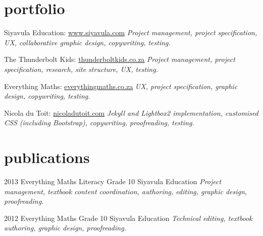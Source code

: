 \documentclass[]{friggeri-cv} %
\begin{document}
\pagebreak

\section{portfolio}
\begin{sitelist}

\site
{}
{Siyavula Education: \href{http://www.siyavula.com}{\underline{www.siyavula.com}}}
{}
{\emph{Project management, project specification, UX, collaborative graphic design, copywriting, testing.}}


\site
{}
{The Thunderbolt Kids: \href{http://thunderboltkids.co.za}{\underline{thunderboltkids.co.za}}}
{}
{\emph{Project management, project specification, research, site structure, UX, testing.}}

\site
{}
{Everything Maths: \href{http://www.everythingmaths.co.za}{\underline{everythingmaths.co.za}}}
{}
{\emph{UX, project specification, graphic design, copywriting, testing.}}



\site
{}
{Nicola du Toit: \href{http://www.nicoladutoit.com/ux-portfolio}{\underline{nicoladutoit.com}}}
{}
{\emph{Jekyll and Lightbox2 implementation, customised CSS (including Bootstrap), copywriting, proofreading, testing.}}
\end{sitelist}

\section{publications}
\begin{entrylist}
\entry
{2013}
{Everything Maths Literacy Grade 10}
{Siyavula Education}
{\emph{Project management, textbook content coordination, authoring, editing, graphic design, proofreading.}}

\entry
{2012}
{Everything Maths Grade 10}
{Siyavula Education}
{\emph{Technical editing, textbook authoring, graphic design, proofreading.}}

\end{entrylist}
\end{document}
